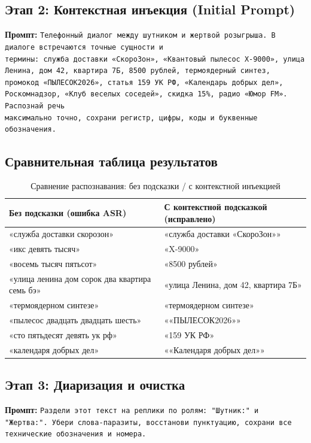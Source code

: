 \documentclass[oneside,a4paper,14pt]{extarticle}
\begin{document}
	\subsection{Этап 2: Контекстная инъекция (Initial Prompt)}
	\noindent\textbf{Промпт:} \texttt{Телефонный диалог между шутником и жертвой розыгрыша. В диалоге встречаются точные сущности и \\ термины: служба доставки «СкороЗон», «Квантовый пылесос X-9000», улица Ленина, дом 42, квартира 7Б, 8500 рублей, термоядерный синтез, промокод «ПЫЛЕСОК2026», статья 159 УК РФ, «Календарь добрых дел», Роскомнадзор, «Клуб веселых соседей», скидка 15\%, радио «Юмор FM». Распознай речь \\ максимально точно, сохрани регистр, цифры, коды и буквенные обозначения.}
	
	
	\subsection{Сравнительная таблица результатов}
	\begin{table}[H]
		\centering
		\caption{Сравнение распознавания: без подсказки / с контекстной инъекцией}
		\begin{tabular}{|p{5.5cm}|p{5.5cm}|}
			\hline
			\textbf{Без подсказки (ошибка ASR)} & \textbf{С контекстной подсказкой (исправлено)} \\ \hline
			«служба доставки скорозон» & «служба доставки «СкороЗон»» \\ \hline
			«икс девять тысяч» & «X-9000» \\ \hline
			«восемь тысяч пятьсот» & «8500 рублей» \\ \hline
			«улица ленина дом сорок два квартира семь бэ» & «улица Ленина, дом 42, квартира 7Б» \\ \hline
			«термоядерном синтезе» & «термоядерном синтезе» \\ \hline
			«пылесос двадцать двадцать шесть» & ««ПЫЛЕСОК2026»» \\ \hline
			«сто пятьдесят девять ук рф» & «159 УК РФ» \\ \hline
			«календаря добрых дел» & ««Календаря добрых дел»» \\ \hline
		\end{tabular}
	\end{table}
	
	\subsection{Этап 3: Диаризация и очистка}
	\noindent\textbf{Промпт:} \texttt{Раздели этот текст на реплики по ролям: "Шутник:" и \\ "Жертва:". Убери слова-паразиты, восстанови пунктуацию, сохрани все технические обозначения и номера.}
	
	
\end{document}
